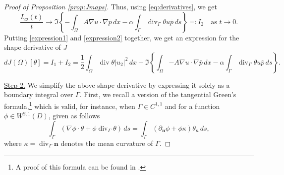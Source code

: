 \documentclass[a4paper,11pt]{article}
\newcommand{\vect}[1]{\boldsymbol{\mathbf{#1}}}
\newcommand{\dive}{\operatorname{div}}
\newcommand{\tandive}{\operatorname{div}_{\varGamma}}
\newcommand{\ui}{u_{2}}
\newcommand{\VV}{\theta}
\newcommand{\Vn}{\theta_{n}}
\newcommand{\nn}{\vect{n}}
\newcommand{\dn}[1]{\partial_{\nn}{#1}}
\newcommand{\intO}[1]{\int_{\varOmega}{#1}{\, {d}{x}}}
\newcommand{\intG}[1]{\int_{\varGamma}{#1}{\, {d}{s}}}
\begin{document}
\begin{proof}[Proof of Proposition \ref{prop:Jmaps}]
	Thus, using \eqref{eq:derivatives}, we get
	\begin{equation}\label{expression2}
		\frac{I_{22}(t)}{t} \longrightarrow \Im\left\{ -\intO{A \nabla {u} \cdot \nabla \overline{p}} - \alpha \intG{ \tandive\! \VV {u} \overline{p}} \right\} \eqqcolon I_{2}\quad \text{as $t \longrightarrow 0$}.
	\end{equation}
	Putting \eqref{expression1} and \eqref{expression2} together, we get an expression for the shape derivative of $J$
	\[
		{d}J(\varOmega)[\VV]
			= I_{1} + I_{2}
			= \frac12 \intO{ \dive \VV |\ui|^{2} } + \Im\left\{ \intO{-A \nabla {u} \cdot \nabla \overline{p}} - \alpha \intG{ \tandive\! \VV {u} \overline{p}} \right\}.
	\] 
	
	\underline{Step 2.} We simplify the above shape derivative by expressing it solely as a boundary integral over $\varGamma$.
	First, we recall a version of the tangential Green's formula,\footnote{A proof of this formula can be found in \cite{MuratSimon1976}.} which is valid, for instance, when $\varGamma \in {C}^{1,1}$ and for a function $\phi \in W^{2,1}(D)$, given as follows
\begin{equation}
	\label{eq:tangential_Greens_formula}
	\intG{\left( \nabla \phi \cdot \VV + \phi \tandive \VV \right) }
		=  \intG{ \left( \dn{\phi}  +\phi \kappa \right) {\Vn}},
\end{equation} 
where $\kappa = \tandive \nn$ denotes the mean curvature of $\varGamma$.
%


\end{proof}
\end{document}

